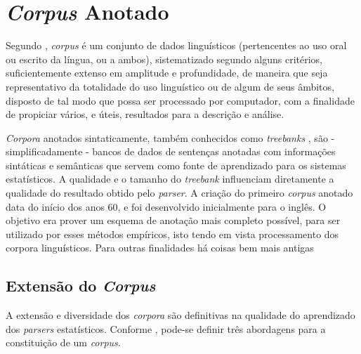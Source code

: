 \section{\emph{Corpus} Anotado} %
\label{sec:corpus_anotado}

Segundo \cite{sardinha04}, \emph{corpus} é um conjunto de dados linguísticos (pertencentes ao uso oral ou escrito da língua, ou a ambos), sistematizado segundo alguns critérios, suficientemente extenso em amplitude e profundidade, de maneira que seja representativo da totalidade do uso linguístico ou de algum de seus âmbitos, disposto de tal modo que possa ser processado por computador, com a finalidade de propiciar vários, e úteis, resultados para a descrição e análise.

\emph{Corpora} anotados sintaticamente, também conhecidos como \emph{treebanks} \cite{abeille03}, são - simplificadamente - bancos de dados de sentenças anotadas com informações sintáticas e semânticas que servem como fonte de aprendizado para os sistemas estatísticos. A qualidade e o tamanho do \emph{treebank} influenciam diretamente a qualidade do resultado obtido pelo \emph{parser}. A criação do primeiro \emph{corpus} anotado data do início dos anos 60, e foi desenvolvido inicialmente para o inglês. O objetivo era prover um esquema de anotação mais completo possível, para ser utilizado por esses métodos empíricos, isto tendo em vista processamento dos corpora linguísticos. Para outras finalidades há coisas bem mais antigas

\subsection{Extensão do \emph{Corpus}} %
\label{sub:extensao_do_corpus}

A extensão e diversidade dos \emph{corpora} são definitivas na qualidade do aprendizado dos \emph{parsers} estatísticos. Conforme \cite{sardinha04}, pode-se definir três abordagens para a constituição de um \emph{corpus}.

